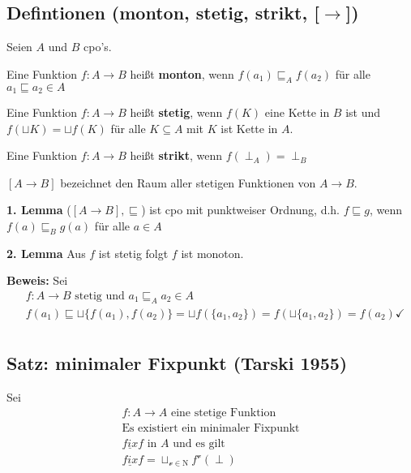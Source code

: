 \begin{compactitem}
\subsection{Defintionen (monton, stetig, strikt, [$\rightarrow$])}
Seien $A$ und $B$ cpo's. 
\begin{compactitem}
	\item Eine Funktion $f: A \rightarrow B$ heißt \textbf{monton}, wenn $f(a_1) \sqsubseteq_A f(a_2)$ für alle $a_1 \sqsubseteq a_2 \in A$
	\item Eine Funktion $f: A \rightarrow B$ heißt \textbf{stetig}, wenn $f(K)$ eine Kette in $B$ ist und $f(\sqcup K) = \sqcup f(K)$ für alle $K \subseteq A$ mit $K$ ist Kette in $A$.
	\item Eine Funktion $f: A \rightarrow B$ heißt \textbf{strikt}, wenn $f(\perp_A) = \perp_B$
	\item $[A\rightarrow B]$ bezeichnet den Raum aller stetigen Funktionen von $A \rightarrow B$.
	\item[\textbf{1. Lemma}] ($[A\rightarrow B], \sqsubseteq$) ist cpo mit punktweiser Ordnung, d.h. $f \sqsubseteq g$, wenn $f (a) \sqsubseteq_B g(a)$ für alle $a \in A$
	\item[\textbf{2. Lemma}] Aus $f$ ist stetig folgt $f$ ist monoton.
	\item[\textbf{Beweis:}] Sei
	\begin{align*}
	&f: A \rightarrow B \text{ stetig und } a_1 \sqsubseteq_A a_2 \in A\\
	&f(a_1) \sqsubseteq \sqcup\{f(a_1), f(a_2) \} = \sqcup f(\{a_1, a_2\}) = f (\sqcup\{a_1, a_2\}) = f(a_2) \checkmark\\
	\end{align*}
\end{compactitem}
\subsection{Satz: minimaler Fixpunkt (Tarski 1955)}
Sei
\begin{align*}
f: A \rightarrow A \text{ eine stetige Funktion} \\ 
\text{Es existiert ein minimaler Fixpunkt}\\
\underline{fix} f \text{ in } A \text { und es gilt}\\
\underline{fix} f = \sqcup_{\mathcal{v} \in \mathrm{N}} f^\mathcal{v}(\perp)\\
\end{align*}

\end{compactitem}
